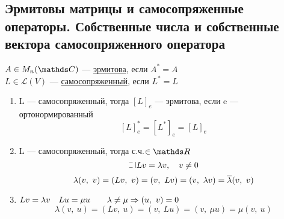 \documentclass[main]{subfiles}
\begin{document}
    \newpage
    \subsection{Эрмитовы матрицы и самосопряженные операторы. Собственные числа и собственные вектора самосопряженного оператора}
    \begin{definition}
        $A \in M_n (\CC)$ --- \ul{эрмитова}, если $A^* = A$\\
        $L \in \mathscr{L}(V)$ --- \ul{самосопряженный}, если $L^* = L$
    \end{definition}

    \begin{properties}
        \begin{enumerate}
            \item L --- самосопряженный, тогда $[L]_e$ --- эрмитова, если e --- ортонормированный
                \[[L]_e^* = [L^*]_e = [L]_e\]
            \item L --- самосопряженный, тогда с.ч.$\in \R$
                \[\letus Lv = \lambda v,\q v \neq 0\]
                \[\lambda(v,\ v) = (Lv,\ v) = (v,\ Lv) = (v,\ \lambda v) = \ol{\lambda} (v,\ v)\]
            \item $Lv = \lambda v\quad Lu = \mu u \qquad \lambda \neq \mu \Rightarrow (u,\ v) = 0$
                \[\lambda (v,\ u) = (Lv,\ u) = (v,\ Lu) = (v,\ \mu u) = \mu (v,\ u)\]
        \end{enumerate}
    \end{properties}
\end{document}

